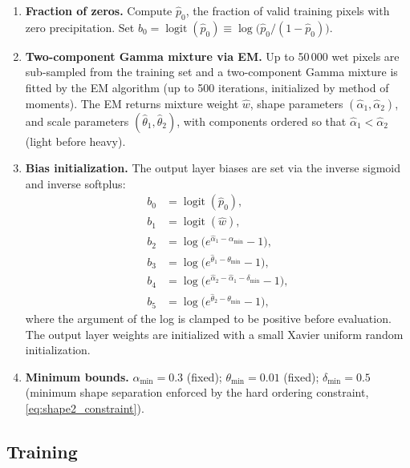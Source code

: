 \documentclass[11pt]{article}
\DeclareMathOperator{\logit}{logit}
\begin{document}
\begin{enumerate}
  \item \textbf{Fraction of zeros.}  Compute $\hat{p}_0$, the
        fraction of valid training pixels with zero precipitation.
        Set $b_0 = \logit(\hat{p}_0) \equiv \log\!\bigl(\hat{p}_0 /
        (1 - \hat{p}_0)\bigr)$.

  \item \textbf{Two-component Gamma mixture via EM.}  Up to 50\,000
        wet pixels are sub-sampled from the training set and a
        two-component Gamma mixture is fitted by the EM algorithm
        (up to 500 iterations, initialized by method of moments).
        The EM returns mixture weight $\hat{w}$, shape parameters
        $(\hat{\alpha}_1, \hat{\alpha}_2)$, and scale parameters
        $(\hat{\theta}_1, \hat{\theta}_2)$, with components ordered
        so that $\hat{\alpha}_1 < \hat{\alpha}_2$ (light before heavy).

  \item \textbf{Bias initialization.}  The output layer biases are set
        via the inverse sigmoid and inverse softplus:
        \begin{align}
          b_0 &= \logit(\hat{p}_0), \\
          b_1 &= \logit(\hat{w}), \\
          b_2 &= \log\!\bigl(e^{\hat{\alpha}_1 - \alpha_{\min}} - 1\bigr), \\
          b_3 &= \log\!\bigl(e^{\hat{\theta}_1 - \theta_{\min}} - 1\bigr), \\
          b_4 &= \log\!\bigl(e^{\hat{\alpha}_2 - \hat{\alpha}_1 - \delta_{\min}} - 1\bigr), \\
          b_5 &= \log\!\bigl(e^{\hat{\theta}_2 - \theta_{\min}} - 1\bigr),
        \end{align}
        where the argument of the log is clamped to be positive before
        evaluation.  The output layer weights are initialized with a
        small Xavier uniform random initialization.

  \item \textbf{Minimum bounds.}  $\alpha_{\min} = 0.3$ (fixed);
        $\theta_{\min} = 0.01$ (fixed); $\delta_{\min} = 0.5$
        (minimum shape separation enforced by the hard ordering
        constraint, \eqref{eq:shape2_constraint}).
\end{enumerate}

\subsection{Training}
\label{sec:training}
\end{document}
